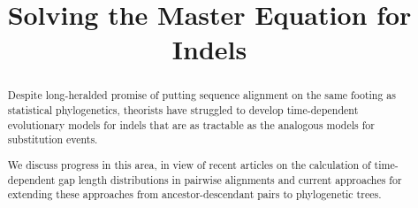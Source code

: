 \documentclass{bmcart}
\begin{document}
\begin{frontmatter}

\begin{fmbox}

\title{Solving the Master Equation for Indels}

\author[
   addressref={aff1},                   %
   corref={aff1},                       %
   email={ihh@berkeley.edu}   %
]{ }

\address[id=aff1]{%
  , %
  ,                              %
}


\end{fmbox}%

\begin{abstractbox}

\begin{abstract} %
Despite long-heralded promise of putting sequence alignment on the same footing as statistical phylogenetics,
theorists have struggled to develop time-dependent evolutionary models for indels that are as tractable
as the analogous models for substitution events.

We discuss progress in this area,
in view of recent articles on the calculation of time-dependent gap length distributions in pairwise alignments
and current approaches for extending these approaches from ancestor-descendant pairs to phylogenetic trees.
\end{abstract}

\begin{keyword}
\end{keyword}


\end{abstractbox}
%

\end{frontmatter}
\end{document}
